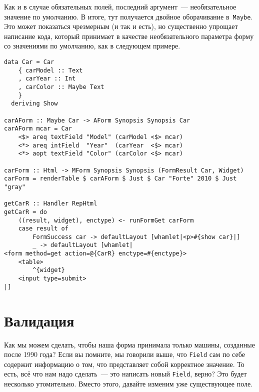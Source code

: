 Как и в случае обязательных полей, последний аргумент~--- необязательное
значение по умолчанию.  В итоге, тут получается двойное оборачивание
в~\lstinline'Maybe'. Это может показаться чрезмерным (и так и есть), но
существенно упрощает написание кода, который принимает в качестве
необязательного параметра форму со значениями по умолчанию, как в следующем
примере.

\begin{lstlisting}[caption={Необязательные поля со значениями по умолчанию}]
data Car = Car
    { carModel :: Text
    , carYear :: Int
    , carColor :: Maybe Text
    }
  deriving Show

carAForm :: Maybe Car -> AForm Synopsis Synopsis Car
carAForm mcar = Car
    <$> areq textField "Model" (carModel <$> mcar)
    <*> areq intField  "Year"  (carYear  <$> mcar)
    <*> aopt textField "Color" (carColor <$> mcar)

carForm :: Html -> MForm Synopsis Synopsis (FormResult Car, Widget)
carForm = renderTable $ carAForm $ Just $ Car "Forte" 2010 $ Just "gray"

getCarR :: Handler RepHtml
getCarR = do
    ((result, widget), enctype) <- runFormGet carForm
    case result of
        FormSuccess car -> defaultLayout [whamlet|<p>#{show car}|]
        _ -> defaultLayout [whamlet|
<form method=get action=@{CarR} enctype=#{enctype}>
    <table>
        ^{widget}
    <input type=submit>
|]
\end{lstlisting}

\section{Валидация}
Как мы можем сделать, чтобы наша форма принимала только машины, созданные
после 1990 года?  Если вы помните, мы говорили выше, что \lstinline'Field' сам
по себе содержит информацию о том, что представляет собой корректное значение. То
есть, всё что нам надо сделать~--- это написать новый \lstinline'Field',
верно? Это будет несколько утомительно. Вместо этого, давайте изменим уже
существующее поле.

